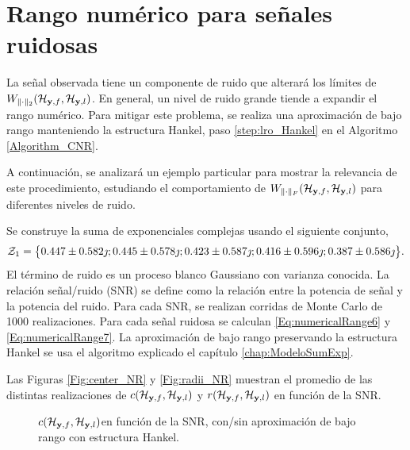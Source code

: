 	\section{Rango numérico para señales ruidosas}
		
		La señal observada tiene un componente de ruido que alterará los límites de $W_{\|\cdot\|_2}(\mathcal{H}_{\mathbf{y},f},\mathcal{H}_{\mathbf{y},l})$. En general, un nivel de ruido grande tiende a expandir el rango numérico. Para mitigar este problema, se realiza una aproximación de bajo rango manteniendo la estructura Hankel, paso \ref{step:lro_Hankel} en el Algoritmo \eqref{Algorithm_CNR}. 
		
		A continuación, se analizará un ejemplo particular para mostrar la relevancia de este procedimiento, estudiando el comportamiento de $W_{\|\cdot\|_F}(\mathcal{H}_{\mathbf{y},f},\mathcal{H}_{\mathbf{y},l})$ para diferentes niveles de ruido.
			
		Se construye la suma de exponenciales complejas usando el siguiente conjunto,
		\begin{equation}
			\mathcal{Z}_1 = \big\{0.447\pm 0.582\jmath; 0.445\pm 0.578\jmath; 0.423\pm 0.587\jmath; 0.416\pm 0.596\jmath; 0.387\pm 0.586\jmath\big\}.
			\label{Eq:Set_z}
		\end{equation}
		El término de ruido es un proceso blanco Gaussiano con varianza conocida. La relación señal/ruido (SNR) se define como la relación entre la potencia de señal y la potencia del ruido. Para cada SNR, se realizan corridas de Monte Carlo de 1000 realizaciones. Para cada señal ruidosa se calculan \eqref{Eq:numericalRange6} y \eqref{Eq:numericalRange7}. La aproximación de bajo rango preservando la estructura Hankel se usa el algoritmo \cite{Grussler2018} explicado el capítulo \ref{chap:ModeloSumExp}.
			
		Las Figuras \eqref{Fig:center_NR} y \eqref{Fig:radii_NR} muestran el promedio de las distintas realizaciones de $c(\mathcal{H}_{\mathbf{y},f},\mathcal{H}_{\mathbf{y},l})$ y $r(\mathcal{H}_{\mathbf{y},f},\mathcal{H}_{\mathbf{y},l})$ en función de la SNR.
			
		\begin{figure}[ht]
			\centering
			\resizebox{0.5\linewidth}{!}{}
			\caption{$c(\mathcal{H}_{\mathbf{y},f},\mathcal{H}_{\mathbf{y},l})$en función de la SNR, con/sin aproximación de bajo rango con estructura Hankel.}
			\label{Fig:center_NR}
		\end{figure}
			
